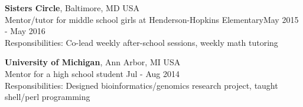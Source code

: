 \documentclass[margin,line]{res}
\begin{document}
\begin{resume}

{\bf Sisters Circle}, Baltimore, MD USA\\
Mentor/tutor for middle school girls at Henderson-Hopkins Elementary\hfill {May 2015 - May 2016}\\
Responsibilities: Co-lead weekly after-school sessions, weekly math tutoring

{\bf University of Michigan}, Ann Arbor, MI USA\\
Mentor for a high school student \hfill {Jul - Aug 2014}\\
Responsibilities: Designed bioinformatics/genomics research project, taught shell/perl programming




\end{resume}
\end{document}
